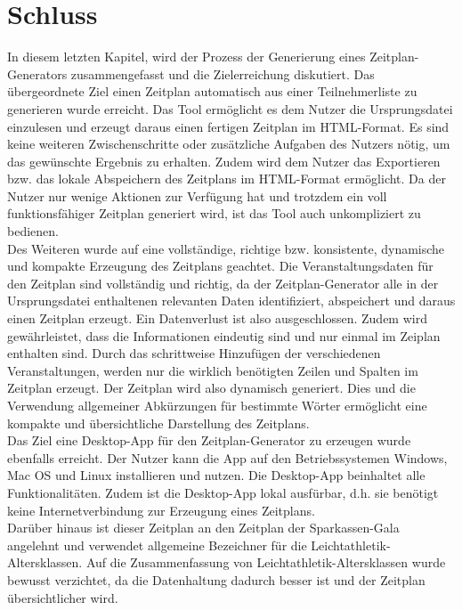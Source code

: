 
\chapter{Schluss}
\label{chap:Schluss}

In diesem letzten Kapitel, wird der Prozess der Generierung eines Zeitplan-Generators zusammengefasst und die Zielerreichung diskutiert.
Das übergeordnete Ziel einen Zeitplan automatisch aus einer Teilnehmerliste zu generieren wurde erreicht. Das Tool ermöglicht es dem Nutzer die Ursprungsdatei einzulesen und erzeugt daraus einen fertigen Zeitplan im HTML-Format. Es sind keine weiteren Zwischenschritte oder zusätzliche Aufgaben des Nutzers nötig, um das gewünschte Ergebnis zu erhalten. Zudem wird dem Nutzer das Exportieren bzw. das lokale Abspeichern des Zeitplans im HTML-Format ermöglicht. Da der Nutzer nur wenige Aktionen zur Verfügung hat und trotzdem ein voll funktionsfähiger Zeitplan generiert wird, ist das Tool auch unkompliziert zu bedienen.\\
Des Weiteren wurde auf eine vollständige, richtige bzw. konsistente, dynamische und kompakte Erzeugung des Zeitplans geachtet. Die Veranstaltungsdaten für den Zeitplan sind vollständig und richtig, da der Zeitplan-Generator alle in der Ursprungsdatei enthaltenen relevanten Daten identifiziert, abspeichert und daraus einen Zeitplan erzeugt. Ein Datenverlust ist also ausgeschlossen. Zudem wird gewährleistet, dass die Informationen eindeutig sind und nur einmal im Zeiplan enthalten sind. Durch das schrittweise Hinzufügen der verschiedenen Veranstaltungen, werden nur die wirklich benötigten Zeilen und Spalten im Zeitplan erzeugt. Der Zeitplan wird also dynamisch generiert. Dies und die Verwendung allgemeiner Abkürzungen für bestimmte Wörter ermöglicht eine kompakte und übersichtliche Darstellung des Zeitplans.\\
Das Ziel eine Desktop-App für den Zeitplan-Generator zu erzeugen wurde ebenfalls erreicht. Der Nutzer kann die App auf den Betriebssystemen Windows, Mac OS und Linux installieren und nutzen. Die Desktop-App beinhaltet alle Funktionalitäten. Zudem ist die Desktop-App lokal ausfürbar, d.h. sie benötigt keine Internetverbindung zur Erzeugung eines Zeitplans.\\
Darüber hinaus ist dieser Zeitplan an den Zeitplan der Sparkassen-Gala angelehnt und verwendet allgemeine Bezeichner für die Leichtathletik-Altersklassen. Auf die Zusammenfassung von Leichtathletik-Altersklassen wurde bewusst verzichtet, da die Datenhaltung dadurch besser ist und der Zeitplan übersichtlicher wird.\\
